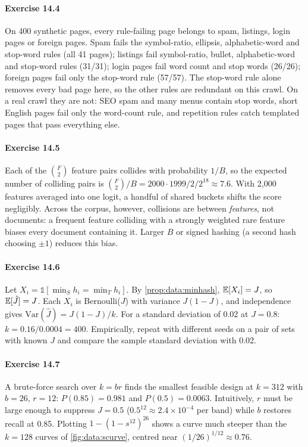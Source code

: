 \paragraph{Exercise 14.4} On 400 synthetic pages, every rule-failing page belongs to spam,
listings, login pages or foreign pages. Spam fails the symbol-ratio, ellipsis, alphabetic-word and
stop-word rules (all 41 pages); listings fail symbol-ratio, bullet, alphabetic-word and stop-word
rules (31/31); login pages fail word count and stop words (26/26); foreign pages fail only the
stop-word rule (57/57). The stop-word rule alone removes every bad page here, so the other
rules are redundant on this crawl. On a real crawl they are not: SEO spam and many menus contain
stop words, short English pages fail only the word-count rule, and repetition rules catch templated
pages that pass everything else.

\paragraph{Exercise 14.5} Each of the $\binom{F}{2}$ feature pairs collides with probability
$1/B$, so the expected number of colliding pairs is $\binom{F}{2}/B = 2000\cdot1999/2/2^{18}\approx 7.6$.
With 2{,}000 features averaged into one logit, a handful of shared buckets shifts the score
negligibly. Across the corpus, however, collisions are between \emph{features}, not documents: a
frequent feature colliding with a strongly weighted rare feature biases every document containing
it. Larger $B$ or signed hashing (a second hash choosing $\pm1$) reduces this bias.

\paragraph{Exercise 14.6} Let $X_i=\mathbb{1}[\min_S h_i = \min_T h_i]$. By
\cref{prop:data:minhash}, $\mathbb{E}[X_i]=J$, so $\mathbb{E}[\hat J]=J$. Each $X_i$ is Bernoulli($J$) with variance
$J(1-J)$, and independence gives $\mathrm{Var}(\hat J)=J(1-J)/k$. For a standard deviation of 0.02 at $J=0.8$:
$k = 0.16/0.0004 = 400$. Empirically, repeat  with different seeds
on a pair of sets with known $J$ and compare the sample standard deviation with 0.02.

\paragraph{Exercise 14.7} A brute-force search over $k=br$ finds the smallest feasible design at
$k=312$ with $b=26$, $r=12$: $P(0.85)=0.981$ and $P(0.5)=0.0063$. Intuitively, $r$ must be large
enough to suppress $J=0.5$ ($0.5^{12}\approx2.4\times10^{-4}$ per band) while $b$ restores recall at
0.85. Plotting $1-(1-s^{12})^{26}$ shows a curve much steeper than the $k=128$ curves of
\cref{fig:data:scurve}, centred near $(1/26)^{1/12}\approx0.76$.

